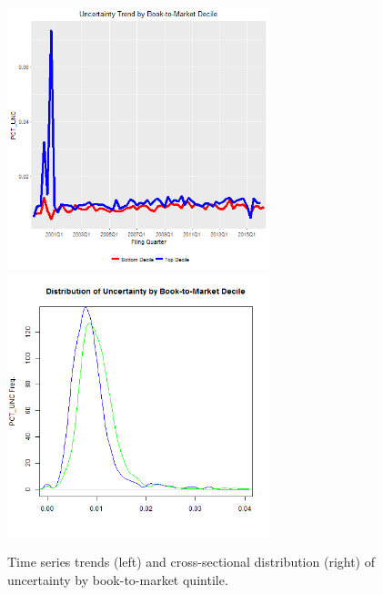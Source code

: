 \begin{figure}[H] 
\centering
\includegraphics[width=3in, height=3in]{figures/punc-by-bm-ts}
\includegraphics[width=3in, height=3in]{figures/punc-by-bm-xs}
\captionsetup{justification=centering, width=.95\textwidth} 
\caption{\footnotesize Time series trends (left) and cross-sectional distribution (right) of uncertainty by book-to-market quintile.} \label{bunc-bm}
\end{figure} 
\newpage
